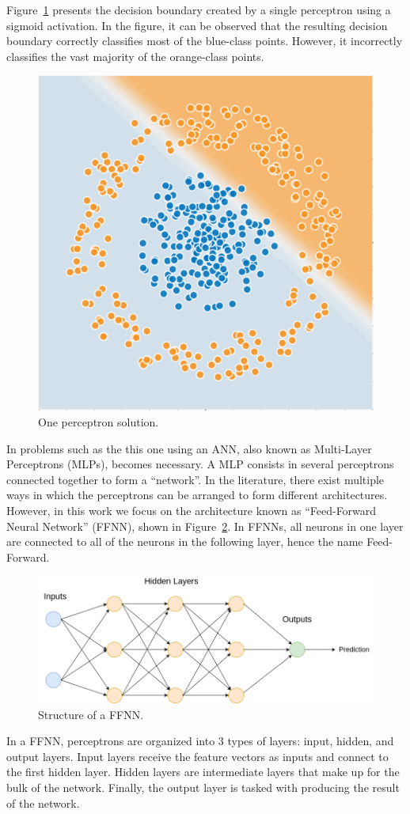Figure~\ref{fig:one_perceptron} presents the decision boundary created by a
single perceptron using a sigmoid activation. In the figure, it can be observed
that the resulting decision boundary correctly classifies most of the blue-class
points. However, it incorrectly classifies the vast majority of the orange-class
points.

\begin{figure}[!htbp]
    \centering
    \includegraphics[width=.35\textwidth]{Images/circles_perceptron.png}
    \caption{One perceptron solution.}
    \label{fig:one_perceptron}
\end{figure}

In problems such as the this one using an ANN, also known as Multi-Layer
Perceptrons (MLPs), becomes necessary. A MLP consists in several perceptrons
connected together to form a ``network''. In the literature, there exist
multiple ways in which the perceptrons can be arranged to form different
architectures. However, in this work we focus on the architecture known as
``Feed-Forward Neural Network'' (FFNN), shown in Figure~\ref{fig:ffnn}. In
FFNNs, all neurons in one layer are connected to all of the neurons in the
following layer, hence the name Feed-Forward.

\begin{figure}[!htbp]
    \centering
    \includegraphics[width=.5\textwidth]{Images/mlp.png}
    \caption{Structure of a FFNN.}
    \label{fig:ffnn}
\end{figure}

In a FFNN, perceptrons are organized into 3 types of layers: input, hidden, and
output layers.  Input layers receive the feature vectors as inputs and connect
to the first hidden layer. Hidden layers are intermediate layers that make up
for the bulk of the network. Finally, the output layer is tasked with producing
the result of the network. 

